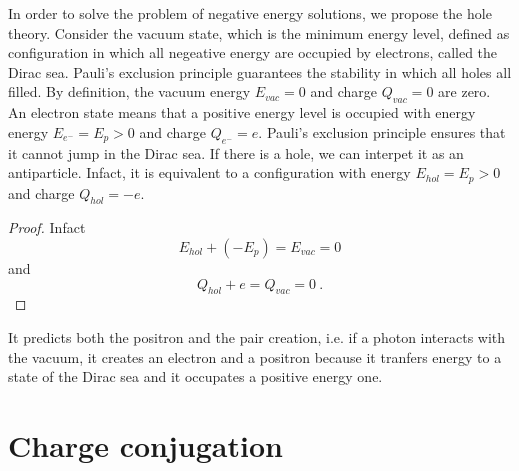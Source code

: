     In order to solve the problem of negative energy solutions, we propose the hole theory. Consider the vacuum state, which is the minimum energy level, defined as configuration in which all negeative energy are occupied by electrons, called the Dirac sea. Pauli's exclusion principle guarantees the stability in which all holes all filled. By definition, the vacuum energy $E_{vac} = 0$ and charge $Q_{vac} = 0$ are zero. An electron state means that a positive energy level is occupied with energy energy $E_{e^-} = E_p > 0$ and charge $Q_{e^-} = e$. Pauli's exclusion principle ensures that it cannot jump in the Dirac sea. If there is a hole, we can interpet it as an antiparticle. Infact, it is equivalent to a configuration with energy $E_{hol} = E_p > 0$ and charge $Q_{hol} = - e$. 
    \begin{proof}
        Infact 
        \begin{equation*}
            E_{hol} + (- E_p) = E_{vac} = 0 
        \end{equation*}
        and 
        \begin{equation*}
            Q_{hol} + e = Q_{vac} = 0 ~.
        \end{equation*}
    \end{proof}
    It predicts both the positron and the pair creation, i.e. if a photon interacts with the vacuum, it creates an electron and a positron because it tranfers energy to a state of the Dirac sea and it occupates a positive energy one.

\section{Charge conjugation}

